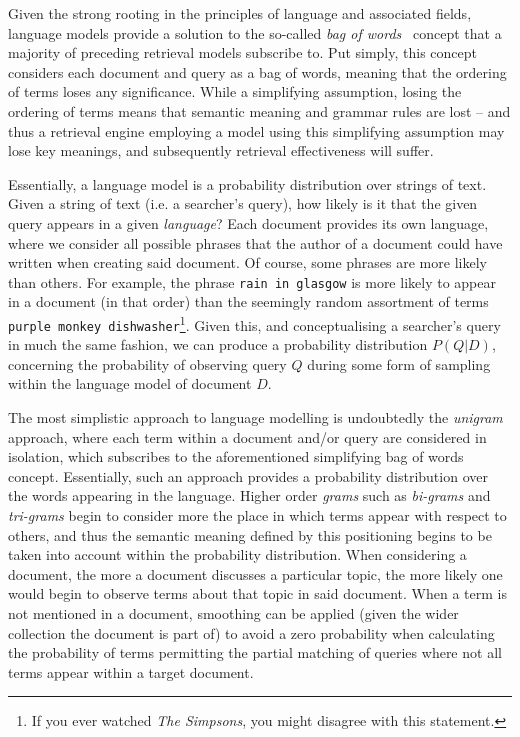 Given the strong rooting in the principles of language and associated fields, language models provide a solution to the so-called \emph{bag of words}~\citep{harris1954distributional} concept that a majority of preceding retrieval models subscribe to. Put simply, this concept considers each document and query as a bag of words, meaning that the ordering of terms loses any significance. While a simplifying assumption, losing the ordering of terms means that semantic meaning and grammar rules are lost -- and thus a retrieval engine employing a model using this simplifying assumption may lose key meanings, and subsequently retrieval effectiveness will suffer.

Essentially, a language model is a probability distribution over strings of text. Given a string of text (i.e. a searcher's query), how likely is it that the given query appears in a given \emph{language}? Each document provides its own language, where we consider all possible phrases that the author of a document could have written when creating said document. Of course, some phrases are more likely than others. For example, the phrase \texttt{rain in glasgow} is more likely to appear in a document (in that order) than the seemingly random assortment of terms \texttt{purple monkey dishwasher}\footnote{If you ever watched \emph{The Simpsons}, you might disagree with this statement.}. Given this, and conceptualising a searcher's query in much the same fashion, we can produce a probability distribution $P(Q|D)$, concerning the probability of observing query $Q$ during some form of sampling within the language model of document $D$.

The most simplistic approach to language modelling is undoubtedly the \emph{unigram} approach, where each term within a document and/or query are considered in isolation, which subscribes to the aforementioned simplifying bag of words concept. Essentially, such an approach provides a probability distribution over the words appearing in the language. Higher order \emph{grams} such as \emph{bi-grams} and \emph{tri-grams} begin to consider more the place in which terms appear with respect to others, and thus the semantic meaning defined by this positioning begins to be taken into account within the probability distribution. When considering a document, the more a document discusses a particular topic, the more likely one would begin to observe terms about that topic in said document. When a term is not mentioned in a document, smoothing can be applied (given the wider collection the document is part of) to avoid a zero probability when calculating the probability of terms permitting the partial matching of queries where not all terms appear within a target document.

